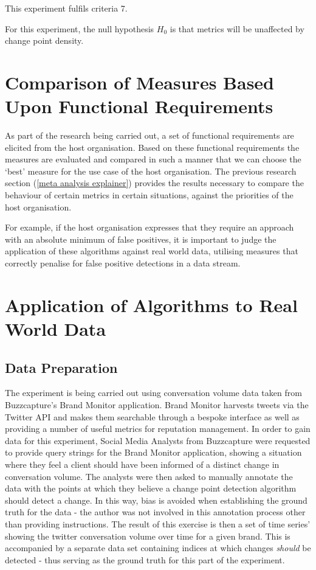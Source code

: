 \documentclass{uvamscse}	%
\begin{document}
This experiment fulfils criteria 7.

For this experiment, the null hypothesis $H_0$ is that metrics will be unaffected by change point density.

\section{Comparison of Measures Based Upon Functional Requirements}

As part of the research being carried out, a set of functional requirements are elicited from the host organisation. Based on these functional requirements the measures are evaluated and compared in such a manner that we can choose the `best' measure for the use case of the host organisation. The previous research section (\autoref{meta analysis explainer}) provides the results necessary to compare the behaviour of certain metrics in certain situations, against the priorities of the host organisation.

For example, if the host organisation expresses that they require an approach with an absolute minimum of false positives, it is important to judge the application of these algorithms against real world data, utilising measures that correctly penalise for false positive detections in a data stream.

\section{Application of Algorithms to Real World Data}
\label{real world explainer}

\subsection{Data Preparation}

The experiment is being carried out using conversation volume data taken from Buzzcapture's Brand Monitor application. Brand Monitor harvests tweets via the Twitter API and makes them searchable through a bespoke interface as well as providing a number of useful metrics for reputation management. In order to gain data for this experiment, Social Media Analysts from Buzzcapture were requested to provide query strings for the Brand Monitor application, showing a situation where they feel a client should have been informed of a distinct change in conversation volume. The analysts were then asked to manually annotate the data with the points at which they believe a change point detection algorithm should detect a change. In this way, bias is avoided when establishing the ground truth for the data - the author was not involved in this annotation process other than providing instructions. The result of this exercise is then a set of time series' showing the twitter conversation volume over time for a given brand. This is accompanied by a separate data set containing indices at which changes \emph{should} be detected - thus serving as the ground truth for this part of the experiment.
\end{document}
